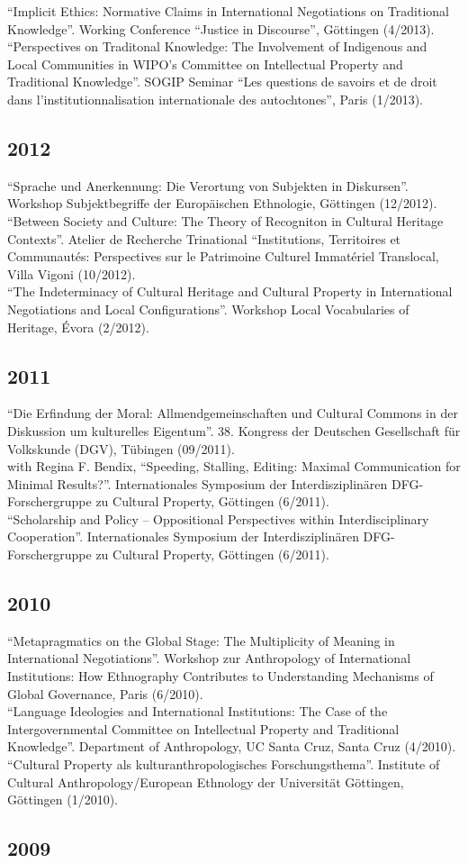 \enquote{Implicit Ethics: Normative Claims in International Negotiations on Traditional Knowledge}. Working Conference “Justice in Discourse”, Göttingen (4/2013).\\[.25cm]\enquote{Perspectives on Traditonal Knowledge: The Involvement of Indigenous and Local Communities in WIPO’s Committee on Intellectual Property and Traditional Knowledge}. SOGIP Seminar “Les questions de savoirs et de droit dans l’institutionnalisation internationale des autochtones”, Paris (1/2013).\subsection*{2012}
\enquote{Sprache und Anerkennung: Die Verortung von Subjekten in Diskursen}. Workshop Subjektbegriffe der Europäischen Ethnologie, Göttingen (12/2012).\\[.25cm]\enquote{Between Society and Culture: The Theory of Recogniton in Cultural Heritage Contexts}. Atelier de Recherche Trinational “Institutions, Territoires et Communautés: Perspectives sur le Patrimoine Culturel Immatériel Translocal, Villa Vigoni (10/2012).\\[.25cm]\enquote{The Indeterminacy of Cultural Heritage and Cultural Property in International Negotiations and Local Configurations}. Workshop Local Vocabularies of Heritage, Évora (2/2012).\subsection*{2011}
\enquote{Die Erfindung der Moral: Allmendgemeinschaften und Cultural Commons in der Diskussion um kulturelles Eigentum}. 38. Kongress der Deutschen Gesellschaft für Volkskunde (DGV), Tübingen (09/2011).\\[.25cm]with Regina F. Bendix, \enquote{Speeding, Stalling, Editing: Maximal Communication for Minimal Results?}. Internationales Symposium der Interdisziplinären DFG-Forschergruppe zu Cultural Property, Göttingen (6/2011).\\[.25cm]\enquote{Scholarship and Policy – Oppositional Perspectives within Interdisciplinary Cooperation}. Internationales Symposium der Interdisziplinären DFG-Forschergruppe zu Cultural Property, Göttingen (6/2011).\subsection*{2010}
\enquote{Metapragmatics on the Global Stage: The Multiplicity of Meaning in International Negotiations}. Workshop zur Anthropology of International Institutions: How Ethnography Contributes to Understanding Mechanisms of Global Governance, Paris (6/2010).\\[.25cm]\enquote{Language Ideologies and International Institutions: The Case of the Intergovernmental Committee on Intellectual Property and Traditional Knowledge}. Department of Anthropology, UC Santa Cruz, Santa Cruz (4/2010).\\[.25cm]\enquote{Cultural Property als kulturanthropologisches Forschungsthema}. Institute of Cultural Anthropology/European Ethnology der Universität Göttingen, Göttingen (1/2010).\subsection*{2009}

